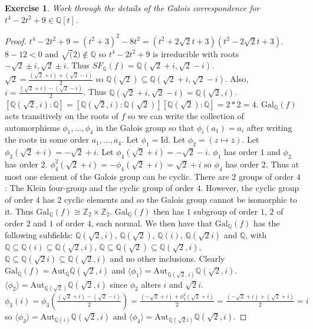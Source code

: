 \documentclass{article}
\newtheorem{exercise}[theorem]{Exercise}
\begin{document}
\begin{exercise}
Work through the details of the Galois correspondence for $t^4-2t^2+9\in\mathbb{Q}[t]$.
\end{exercise}
\begin{proof}
$t^4-2t^2+9=(t^2+3)^2-8t^2=(t^2+2\sqrt{2}t+3)(t^2-2\sqrt{2}t+3)$. $8-12<0$ and $\sqrt(2)\not\in\mathbb{Q}$ so $t^4-2t^2+9$ is irreducible with roots $-\sqrt{2}\pm i,\sqrt{2}\pm i$. Thus $SF_\mathbb{Q}(f)=\mathbb{Q}(\sqrt{2}+i,\sqrt{2}-i)$. $\sqrt{2}=\frac{(\sqrt{2}+i)+(\sqrt{2}-i)}{2}$ so $\mathbb{Q}(\sqrt{2})\subseteq\mathbb{Q}(\sqrt{2}+i,\sqrt{2}-i)$. Also, $i=\frac{(\sqrt{2}+i)-(\sqrt{2}-i)}{2}$. Thus $\mathbb{Q}(\sqrt{2}+i,\sqrt{2}-i)=\mathbb{Q}(\sqrt{2},i)$. $[\mathbb{Q}(\sqrt{2},i):\mathbb{Q}]=[\mathbb{Q}(\sqrt{2},i):\mathbb{Q}(\sqrt{2})][\mathbb{Q}(\sqrt{2}):\mathbb{Q}]=2*2=4$. $\text{Gal}_\mathbb{Q}(f)$ acts transitively on the roots of $f$ so we can write the collection of automorphisms $\phi_1,...,\phi_4$ in the Galois group so that $\phi_i(a_1)=a_i$ after writing the roots in some order $a_1,...,a_4$. Let $\phi_1=\text{Id}$. Let $\phi_2=(z\mapsto \overline{z})$. Let $\phi_3(\sqrt{2}+i)=-\sqrt{2}+i$. Let $\phi_4(\sqrt{2}+i)=-\sqrt{2}-i$. $\phi_1$ has order $1$ and $\phi_2$ has order $2$. $\phi_4^2(\sqrt{2}+i)=-\phi_4(\sqrt{2}+i)=\sqrt{2}+i$ so $\phi_4$ has order $2$. Thus at most one element of the Galois group can be cyclic. There are $2$ groups of order $4$: The Klein four-group and the cyclic group of order $4$. However, the cyclic group of order $4$ has $2$ cyclic elements and so the Galois group cannot be isomorphic to it. Thus $\text{Gal}_\mathbb{Q}(f)\cong\mathbb{Z}_2\times\mathbb{Z}_2$. $\text{Gal}_\mathbb{Q}(f)$ then has $1$ subgroup of order $1$, $2$ of order $2$ and $1$ of order $4$, each normal. We then have that $\text{Gal}_\mathbb{Q}(f)$ has the following subfields: $\mathbb{Q}(\sqrt{2},i)$, $\mathbb{Q}(\sqrt{2})$, $\mathbb{Q}(i)$, $\mathbb{Q}(\sqrt{2}i)$ and $\mathbb{Q}$, with $\mathbb{Q}\subseteq\mathbb{Q}(i)\subseteq\mathbb{Q}(\sqrt{2},i)$, $\mathbb{Q}\subseteq\mathbb{Q}(\sqrt{2})\subseteq\mathbb{Q}(\sqrt{2},i)$, $\mathbb{Q}\subseteq\mathbb{Q}(\sqrt{2}i)\subseteq\mathbb{Q}(\sqrt{2},i)$ and no other inclusions. Clearly $\text{Gal}_\mathbb{Q}(f)=\text{Aut}_\mathbb{Q}\mathbb{Q}(\sqrt{2},i)$ and $\langle\phi_1\rangle=\text{Aut}_{\mathbb{Q}(\sqrt{2},i)}\mathbb{Q}(\sqrt{2},i)$. $\langle \phi_2\rangle=\text{Aut}_{\mathbb{Q}(\sqrt{2})}\mathbb{Q}(\sqrt{2},i)$ since $\phi_2$ alters $i$ and $\sqrt{2}i$. $\phi_3(i)=\phi_3(\frac{(\sqrt{2}+i)-(\sqrt{2}-i)}{2})=\frac{(-\sqrt{2}+i)+\phi_3^2(\sqrt{2}+i)}{2}=\frac{(-\sqrt{2}+i)+(\sqrt{2}+i)}{2}=i$ so $\langle\phi_3\rangle=\text{Aut}_{\mathbb{Q}(i)}\mathbb{Q}(\sqrt{2},i)$ and $\langle\phi_4\rangle=\text{Aut}_{\mathbb{Q}(\sqrt{2}i)}\mathbb{Q}(\sqrt{2},i)$.
\end{proof}
\end{document}
